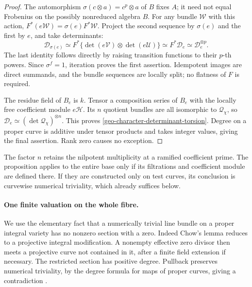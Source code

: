 \begin{proof}
The automorphism $\sigma(c\otimes a)=c^p\otimes a$ of $B$ fixes $A$;
it need not equal Frobenius on the possibly nonreduced algebra $B$.
For any bundle $\mathcal W$ with this action,
$F^*(e\mathcal W)=\sigma(e)F^*\mathcal W$. Project the second
sequence by $\sigma(e)$ and the first by $e$, and take determinants:
\[
 \mathcal D_{\sigma(e)}
 \simeq F^*\{\det(e\mathcal V)\otimes\det(e\mathcal U)\}
 \simeq F^*\mathcal D_e
 \simeq\mathcal D_e^{\otimes p}.
\]
The last identity follows directly by raising transition functions
to their $p$-th powers. Since $\sigma^f=1$, iteration proves the
first assertion. Idempotent images are direct summands, and the
bundle sequences are locally split; no flatness of $F$ is required.

The residue field of $B_e$ is $k$. Tensor a composition series of
$B_e$ with the locally free coefficient module $e\mathcal H$.
Its $n$ quotient bundles are all isomorphic to $\mathcal Q_\chi$,
so $\mathcal D_e\simeq(\det\mathcal Q_\chi)^{\otimes n}$.
This proves \eqref{geo-character-determinant-torsion}.
Degree on a proper curve is additive under tensor products and
takes integer values, giving the final assertion. Rank zero causes
no exception.
\end{proof}

The factor $n$ retains the nilpotent multiplicity at a ramified
coefficient prime. The proposition applies to the entire base only
if its filtrations and coefficient module are defined there. If
they are constructed only on test curves, its conclusion is
curvewise numerical triviality, which already suffices below.

\paragraph{One finite valuation on the whole fibre.}
We use the elementary fact that a numerically trivial line bundle on
a proper integral variety has no nonzero section with a zero.
Indeed Chow's lemma reduces to a projective integral modification.
A nonempty effective zero divisor then meets a projective curve
not contained in it, after a finite field extension if necessary.
The restricted section has positive degree. Pullback preserves
numerical triviality, by the degree formula for maps of proper
curves, giving a contradiction
\cite[Tags 0200 and 0B40]{stacks-finite-place}.

